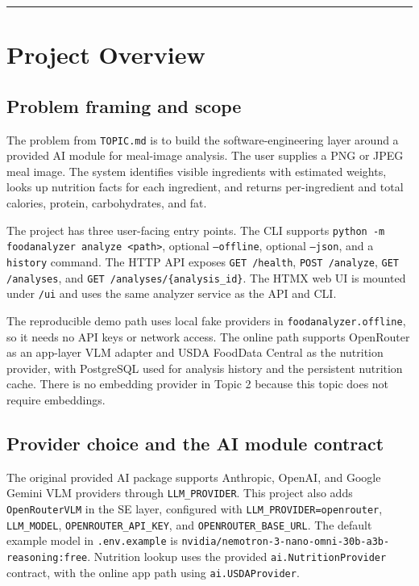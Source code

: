 \documentclass[11pt,a4paper]{article}
\begin{document}
\tableofcontents
\vspace{0.6em}\hrule\vspace{0.4em}

\section{Project Overview}

\subsection{Problem framing and scope}

The problem from \texttt{TOPIC.md} is to build the software-engineering layer around a provided AI module for meal-image analysis. The user supplies a PNG or JPEG meal image. The system identifies visible ingredients with estimated weights, looks up nutrition facts for each ingredient, and returns per-ingredient and total calories, protein, carbohydrates, and fat.

The project has three user-facing entry points. The CLI supports \texttt{python -m foodanalyzer analyze <path>}, optional \texttt{--offline}, optional \texttt{--json}, and a \texttt{history} command. The HTTP API exposes \texttt{GET /health}, \texttt{POST /analyze}, \texttt{GET /analyses}, and \texttt{GET /analyses/\{analysis\_id\}}. The HTMX web UI is mounted under \texttt{/ui} and uses the same analyzer service as the API and CLI.

The reproducible demo path uses local fake providers in \texttt{foodanalyzer.offline}, so it needs no API keys or network access. The online path supports OpenRouter as an app-layer VLM adapter and USDA FoodData Central as the nutrition provider, with PostgreSQL used for analysis history and the persistent nutrition cache. There is no embedding provider in Topic 2 because this topic does not require embeddings.

\subsection{Provider choice and the AI module contract}

The original provided AI package supports Anthropic, OpenAI, and Google Gemini VLM providers through \texttt{LLM\_PROVIDER}. This project also adds \texttt{OpenRouterVLM} in the SE layer, configured with \texttt{LLM\_PROVIDER=openrouter}, \texttt{LLM\_MODEL}, \texttt{OPENROUTER\_API\_KEY}, and \texttt{OPENROUTER\_BASE\_URL}. The default example model in \texttt{.env.example} is \texttt{nvidia/nemotron-3-nano-omni-30b-a3b-reasoning:free}. Nutrition lookup uses the provided \texttt{ai.NutritionProvider} contract, with the online app path using \texttt{ai.USDAProvider}.
\end{document}
